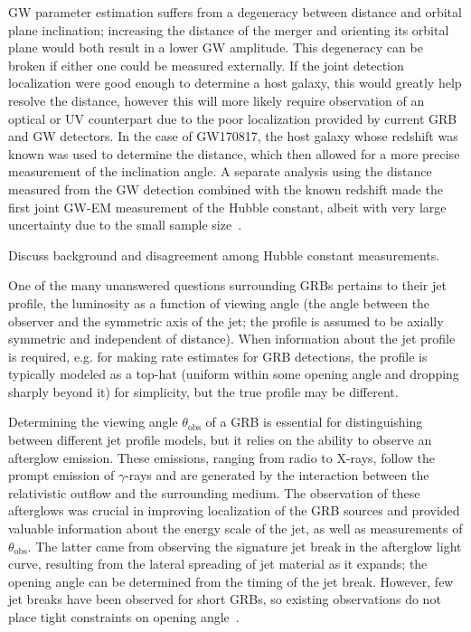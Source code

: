 \ac{GW} parameter estimation suffers from a degeneracy between distance and orbital plane inclination; increasing the distance of the merger and orienting its orbital plane would both result in a lower \ac{GW} amplitude.
This degeneracy can be broken if either one could be measured externally.
If the joint detection localization were good enough to determine a host galaxy, this would greatly help resolve the distance, however this will more likely require observation of an optical or UV counterpart due to the poor localization provided by current \ac{GRB} and \ac{GW} detectors.
In the case of GW170817, the host galaxy whose redshift was known was used to determine the distance, which then allowed for a more precise measurement of the inclination angle.
A separate analysis using the distance measured from the \ac{GW} detection combined with the known redshift made the first joint \ac{GW}-EM measurement of the Hubble constant, albeit with very large uncertainty due to the small sample size~\citep{gw170817_hubble}.

{\color{red}Discuss background and disagreement among Hubble constant measurements.}

One of the many unanswered questions surrounding \acp{GRB} pertains to their jet profile, the luminosity as a function of viewing angle (the angle between the observer and the symmetric axis of the jet; the profile is assumed to be axially symmetric and independent of distance).
When information about the jet profile is required, e.g. for making rate estimates for \ac{GRB} detections, the profile is typically modeled as a top-hat (uniform within some opening angle and dropping sharply beyond it) for simplicity, but the true profile may be different.

Determining the viewing angle $\theta_{\mathrm{obs}}$ of a \ac{GRB} is essential for distinguishing between different jet profile models, but it relies on the ability to observe an afterglow emission.
These emissions, ranging from radio to X-rays, follow the prompt emission of $\gamma$-rays and are generated by the interaction between the relativistic outflow and the surrounding medium.
The observation of these afterglows was crucial in improving localization of the \ac{GRB} sources and provided valuable information about the energy scale of the jet, as well as measurements of $\theta_{\mathrm{obs}}$.
The latter came from observing the signature jet break in the afterglow light curve, resulting from the lateral spreading of jet material as it expands; the opening angle can be determined from the timing of the jet break.
However, few jet breaks have been observed for short \acp{GRB}, so existing observations do not place tight constraints on opening angle~\citep{Biscoveanu_2020}.

